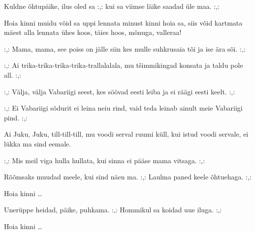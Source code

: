 Kuldne \~ohtup\"aike, ilus oled sa
:,: kui sa viimse l\"aike saadad \"ule maa. :,:

Hoia kinni muidu v\~oid sa uppi lennata
minust kinni hoia sa,
siis v\~oid kartmata m\"aest alla lennata
\"uhes koos, t\"aies hoos, m\~onuga, valleraa!

:,: Mama, mama, see poiss on j\"alle siin
kes mulle suhkrusaia t\~oi ja ise \"ara s\~oi. :,:

:,: Ai trika-trika-trika-trika-trallalalala,
mu t\v{s}immikingad konsata ja taldu pole all. :,:

:,: V\"alja, v\"alja Vabariigi seest, kes
s\"o\"ovad eesti leiba ja ei r\"a\"agi eesti keelt. :,:

:,: Ei Vabariigi s\~odurit ei leina neiu rind,
vaid teda leinab ainult meie Vabariigi pind. :,:

Ai Juku, Juku, till-till-till,
mu voodi serval ruumi k\"ull,
kui istud voodi servale,
ei l\"ukka ma sind eemale.

:,: Mis meil viga hulla hullata,
kui sinna ei p\"a\"ase mama vitsaga. :,:

R\~o\~omsaks muudad meele, kui sind n\"aen ma.
:,: Laulma paned keele \~ohtuehaga. :,:

Hoia kinni \ldots

Uner\"uppe heidad, p\"aike, puhkama.
:,: Hommikul sa koidad uue iluga. :,:

Hoia kinni \ldots
